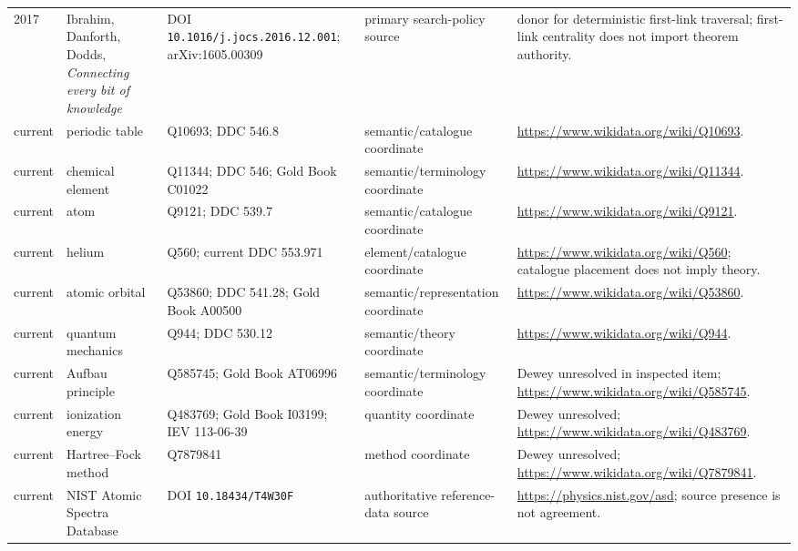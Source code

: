 \begin{longtable}{p{}p{}p{}p{}p{}}
2017 & Ibrahim, Danforth, Dodds, \emph{Connecting every bit of knowledge} & DOI \texttt{10.1016/j.jocs.2016.12.001}; arXiv:1605.00309 & primary search-policy source & donor for deterministic first-link traversal; first-link centrality does not import theorem authority.\\
current & periodic table & Q10693; DDC 546.8 & semantic/catalogue coordinate & \url{https://www.wikidata.org/wiki/Q10693}.\\
current & chemical element & Q11344; DDC 546; Gold Book C01022 & semantic/terminology coordinate & \url{https://www.wikidata.org/wiki/Q11344}.\\
current & atom & Q9121; DDC 539.7 & semantic/catalogue coordinate & \url{https://www.wikidata.org/wiki/Q9121}.\\
current & helium & Q560; current DDC 553.971 & element/catalogue coordinate & \url{https://www.wikidata.org/wiki/Q560}; catalogue placement does not imply theory.\\
current & atomic orbital & Q53860; DDC 541.28; Gold Book A00500 & semantic/representation coordinate & \url{https://www.wikidata.org/wiki/Q53860}.\\
current & quantum mechanics & Q944; DDC 530.12 & semantic/theory coordinate & \url{https://www.wikidata.org/wiki/Q944}.\\
current & Aufbau principle & Q585745; Gold Book AT06996 & semantic/terminology coordinate & Dewey unresolved in inspected item; \url{https://www.wikidata.org/wiki/Q585745}.\\
current & ionization energy & Q483769; Gold Book I03199; IEV 113-06-39 & quantity coordinate & Dewey unresolved; \url{https://www.wikidata.org/wiki/Q483769}.\\
current & Hartree--Fock method & Q7879841 & method coordinate & Dewey unresolved; \url{https://www.wikidata.org/wiki/Q7879841}.\\
current & NIST Atomic Spectra Database & DOI \texttt{10.18434/T4W30F} & authoritative reference-data source & \url{https://physics.nist.gov/asd}; source presence is not agreement.\\
\bottomrule
\end{longtable}


